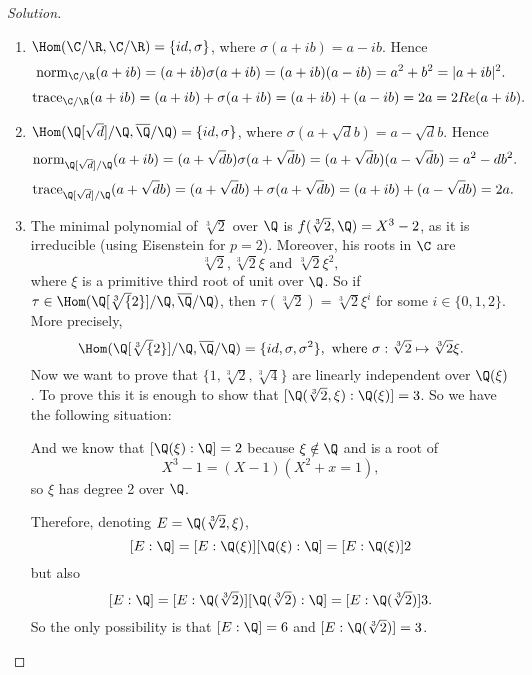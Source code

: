 \documentclass[a4paper,10pt,reqno]{amsart}
\newenvironment{sol}
  {\renewcommand\qedsymbol{$\blacksquare$}\begin{proof}[Solution]}
  {\end{proof}}
\begin{document}
\begin{sol}
    ~
    \begin{enumerate}[label=(\roman*)]
     \item $\Hom(\C/\R,\C/\R)=\{id, \sigma\}$,
     where $\sigma(a+ib)=a-ib$.
     Hence 
     \[
     \mathrm{norm}_{\C/\R}(a+ib)=(a+ib)\sigma(a+ib)=(a+ib)(a-ib)=a^2+b^2=|a+ib|^2.
     \]
     \[
     \mathrm{trace}_{\C/\R}(a+ib)=(a+ib)+\sigma(a+ib)=(a+ib)+(a-ib)=2a=2Re(a+ib).
     \]
     \item $\Hom(\Q[\sqrt{d}]/\Q,\overline{\Q}/\Q)=\{id, \sigma\}$,
     where $\sigma(a+\sqrt{d}b)=a-\sqrt{d}b$.
     Hence
     \[
     \mathrm{norm}_{\Q[\sqrt{d}]/\Q}(a+ib)=(a+\sqrt{d}b)\sigma(a+\sqrt{d}b)=(a+\sqrt{d}b)(a-\sqrt{d}b)=a^2-db^2.
     \]
     \[\mathrm{trace}_{\Q[\sqrt{d}]/\Q}(a+\sqrt{d}b)=(a+\sqrt{d}b)+\sigma(a+\sqrt{d}b)=(a+ib)+(a-\sqrt{d}b)=2a.
     \]
     \item The minimal polynomial of $\sqrt[3]{2}$ over
     $\Q$ is $f(\sqrt[3]{2},\Q)=X^3-2$, as it is 
     irreducible (using Eisenstein for $p=2$).
     Moreover, his roots in $\C$ are 
     \[
     \sqrt[3]{2},\sqrt[3]{2}\xi\text{ and }\sqrt[3]{2}\xi^2,
     \]
     where $\xi$ is a primitive third root of unit 
     over $\Q$.
     So if $\tau\in\Hom(\Q[\sqrt[3]{2}]/\Q, \overline{\Q}/\Q)$,
     then $\tau(\sqrt[3]{2})=\sqrt[3]{2}\xi^i$ for 
     some $i\in\{0,1,2\}$.
     More precisely,
     \[
     \Hom(\Q[\sqrt[3]{2}]/\Q,\overline{\Q}/\Q)=\{id, \sigma, \sigma^2\},
     \text{ where }
     \sigma:\sqrt[3]{2}\mapsto \sqrt[3]{2}\xi.
     \]
     Now we want to prove that
     $\{1,\sqrt[3]{2},\sqrt[3]{4}\}$ are linearly independent over $\Q(\xi)$.
     To prove this it is enough to show that 
     $[\Q(\sqrt[3]{2},\xi):\Q(\xi)]=3$.
     So we have the following situation:
     \begin{center}
    \end{center}
    And we know that $[\Q(\xi):\Q]=2$ because 
    $\xi\notin\Q$ and is a root of
    $$X^3-1=(X-1)(X^2+x=1),$$
    so $\xi$ has degree 2 over $\Q$.

    Therefore, denoting $E=\Q(\sqrt[3]{2},\xi)$,
    \[
    [E:\Q]=[E:\Q(\xi)][\Q(\xi):\Q]=[E:\Q(\xi)]2
    \]
    but also
    \[
    [E:\Q]=[E:\Q(\sqrt[3]{2})][\Q(\sqrt[3]{2}):\Q]=[E:\Q(\sqrt[3]{2})]3.
    \]
    So the only possibility is that $[E:\Q]=6$ and 
    $[E:\Q(\sqrt[3]{2})]=3$.
     

\end{enumerate}
\end{sol}
\end{document}
